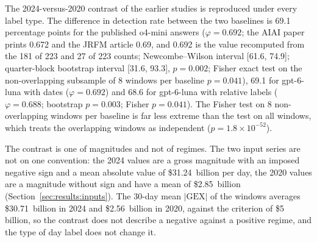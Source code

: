 The 2024-versus-2020 contrast of the earlier studies is reproduced under every label type. The difference in detection rate between the two baselines is 69.1 percentage points for the published o4-mini answers ($\varphi=0.692$; the AIAI paper prints 0.672 and the JRFM article 0.69, and 0.692 is the value recomputed from the 181 of 223 and 27 of 223 counts; Newcombe--Wilson interval [61.6, 74.9]; quarter-block bootstrap interval [31.6, 93.3], $p=0.002$; Fisher exact test on the non-overlapping subsample of 8 windows per baseline $p=0.041$), 69.1 for gpt-6-luna with dates ($\varphi=0.692$) and 68.6 for gpt-6-luna with relative labels ($\varphi=0.688$; bootstrap $p=0.003$; Fisher $p=0.041$). The Fisher test on 8 non-overlapping windows per baseline is far less extreme than the test on all windows, which treats the overlapping windows as independent ($p=1.8\times10^{-52}$).

The contrast is one of magnitudes and not of regimes. The two input series are not on one convention: the 2024 values are a gross magnitude with an imposed negative sign and a mean absolute value of \$31.24~billion per day, the 2020 values are a magnitude without sign and have a mean of \$2.85~billion (Section~\ref{sec:results:inputs}). The 30-day mean $|\mathrm{GEX}|$ of the windows averages \$30.71~billion in 2024 and \$2.56~billion in 2020, against the criterion of \$5 billion, so the contrast does not describe a negative against a positive regime, and the type of day label does not change it.

